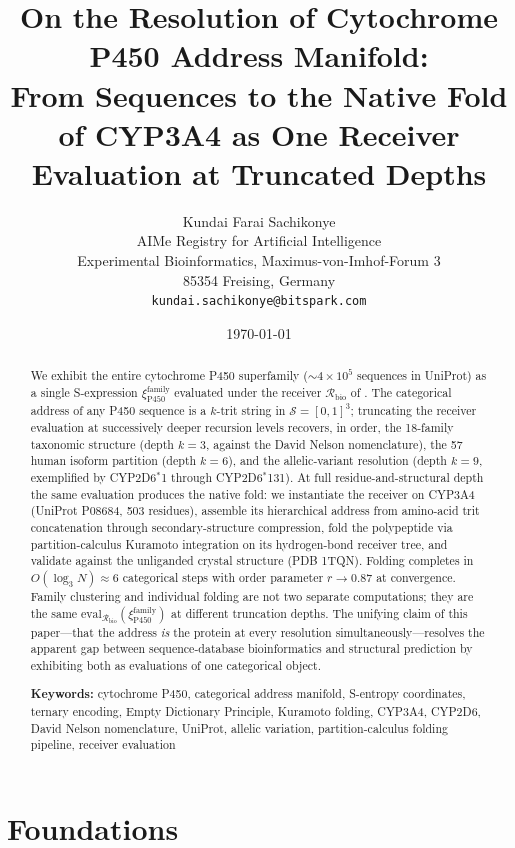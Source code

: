 \documentclass[11pt,twocolumn,a4paper]{article}
\title{\textbf{On the Resolution of Cytochrome P450 Address Manifold:\\
From Sequences to the Native Fold of CYP3A4 as One Receiver Evaluation at Truncated Depths}}
\author{
Kundai Farai Sachikonye\\[0.3em]
AIMe Registry for Artificial Intelligence\\
Experimental Bioinformatics, Maximus-von-Imhof-Forum 3\\
85354 Freising, Germany\\
\texttt{kundai.sachikonye@bitspark.com}
}
\date{\today}
\theoremstyle{definition}
\theoremstyle{remark}
\newcommand{\Sspace}{\mathcal{S}}
\newcommand{\Recv}{\mathcal{R}}
\newcommand{\eval}{\mathrm{eval}}
\newcommand{\Sexp}{\xi}
\newcommand{\orderpar}{r}
\begin{document}
\maketitle

\begin{abstract}
We exhibit the entire cytochrome P450 superfamily ($\sim 4 \times 10^5$ sequences in UniProt) as a single S-expression $\Sexp_{\mathrm{P450}}^{\mathrm{family}}$ evaluated under the receiver $\Recv_{\mathrm{bio}}$ of \citep{sachikonye2025_paper1}. The categorical address of any P450 sequence is a $k$-trit string in $\Sspace = [0,1]^3$; truncating the receiver evaluation at successively deeper recursion levels recovers, in order, the 18-family taxonomic structure (depth $k=3$, against the David Nelson nomenclature), the 57 human isoform partition (depth $k=6$), and the allelic-variant resolution (depth $k=9$, exemplified by CYP2D6$^*$1 through CYP2D6$^*$131). At full residue-and-structural depth the same evaluation produces the native fold: we instantiate the receiver on CYP3A4 (UniProt P08684, 503 residues), assemble its hierarchical address from amino-acid trit concatenation through secondary-structure compression, fold the polypeptide via partition-calculus Kuramoto integration on its hydrogen-bond receiver tree, and validate against the unliganded crystal structure (PDB 1TQN). Folding completes in $O(\log_3 N) \approx 6$ categorical steps with order parameter $\orderpar \to 0.87$ at convergence. Family clustering and individual folding are not two separate computations; they are the same $\eval_{\Recv_{\mathrm{bio}}}(\Sexp_{\mathrm{P450}}^{\mathrm{family}})$ at different truncation depths. The unifying claim of this paper---that the address \emph{is} the protein at every resolution simultaneously---resolves the apparent gap between sequence-database bioinformatics and structural prediction by exhibiting both as evaluations of one categorical object.

\medskip
\noindent\textbf{Keywords:} cytochrome P450, categorical address manifold, S-entropy coordinates, ternary encoding, Empty Dictionary Principle, Kuramoto folding, CYP3A4, CYP2D6, David Nelson nomenclature, UniProt, allelic variation, partition-calculus folding pipeline, receiver evaluation
\end{abstract}

\part{Foundations}
\end{document}
